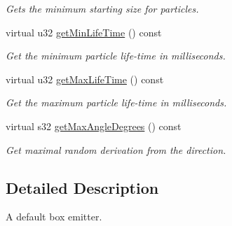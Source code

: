 \begin{DoxyCompactItemize}
\begin{DoxyCompactList}\small\item\em Gets the minimum starting size for particles. \end{DoxyCompactList}\item 
\hypertarget{classirr_1_1scene_1_1_c_particle_mesh_emitter_a2d35dce0f738988c9585304dbd1cf74e}{virtual u32 \hyperlink{classirr_1_1scene_1_1_c_particle_mesh_emitter_a2d35dce0f738988c9585304dbd1cf74e}{get\-Min\-Life\-Time} () const }\label{classirr_1_1scene_1_1_c_particle_mesh_emitter_a2d35dce0f738988c9585304dbd1cf74e}

\begin{DoxyCompactList}\small\item\em Get the minimum particle life-\/time in milliseconds. \end{DoxyCompactList}\item 
\hypertarget{classirr_1_1scene_1_1_c_particle_mesh_emitter_ad4d0a1b5ec74c6e42920690dc17279df}{virtual u32 \hyperlink{classirr_1_1scene_1_1_c_particle_mesh_emitter_ad4d0a1b5ec74c6e42920690dc17279df}{get\-Max\-Life\-Time} () const }\label{classirr_1_1scene_1_1_c_particle_mesh_emitter_ad4d0a1b5ec74c6e42920690dc17279df}

\begin{DoxyCompactList}\small\item\em Get the maximum particle life-\/time in milliseconds. \end{DoxyCompactList}\item 
\hypertarget{classirr_1_1scene_1_1_c_particle_mesh_emitter_a046009ac68e9eeaba31c0a3b531c1f2e}{virtual s32 \hyperlink{classirr_1_1scene_1_1_c_particle_mesh_emitter_a046009ac68e9eeaba31c0a3b531c1f2e}{get\-Max\-Angle\-Degrees} () const }\label{classirr_1_1scene_1_1_c_particle_mesh_emitter_a046009ac68e9eeaba31c0a3b531c1f2e}

\begin{DoxyCompactList}\small\item\em Get maximal random derivation from the direction. \end{DoxyCompactList}\end{DoxyCompactItemize}


\subsection{Detailed Description}
A default box emitter. 

